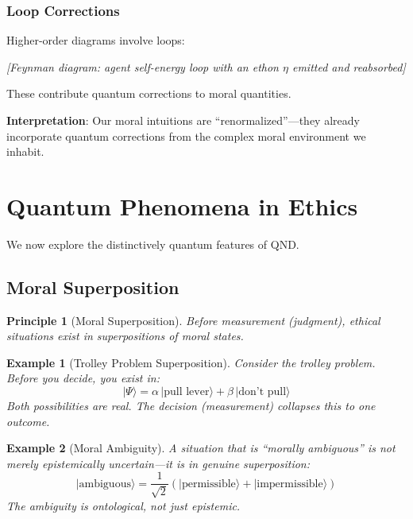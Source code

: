 \documentclass[12pt]{article}
\newtheorem{principle}{Principle}
\newtheorem{example}{Example}[section]
\begin{document}
\subsubsection{Loop Corrections}

Higher-order diagrams involve loops:

\begin{center}
\emph{[Feynman diagram: agent self-energy loop with an ethon $\eta$ emitted and reabsorbed]}
\end{center}

These contribute quantum corrections to moral quantities.

\textbf{Interpretation}: Our moral intuitions are ``renormalized''---they already incorporate quantum corrections from the complex moral environment we inhabit.

\section{Quantum Phenomena in Ethics}

We now explore the distinctively quantum features of QND.

\subsection{Moral Superposition}

\begin{principle}[Moral Superposition]
\emph{Before measurement (judgment), ethical situations exist in superpositions of moral states.}
\end{principle}

\begin{example}[Trolley Problem Superposition]
Consider the trolley problem. Before you decide, you exist in:
\begin{equation}
    |\Psi\rangle = \alpha \,|\text{pull lever}\rangle + \beta \,|\text{don't pull}\rangle
\end{equation}
Both possibilities are real. The decision (measurement) collapses this to one outcome.
\end{example}

\begin{example}[Moral Ambiguity]
A situation that is ``morally ambiguous'' is not merely epistemically uncertain---it is in genuine superposition:
\begin{equation}
    |\text{ambiguous}\rangle = \frac{1}{\sqrt{2}} \left( |\text{permissible}\rangle + |\text{impermissible}\rangle \right)
\end{equation}
The ambiguity is ontological, not just epistemic.
\end{example}
\end{document}
